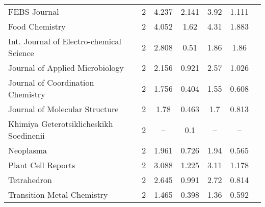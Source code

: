 {\begin{longtable}[c]{lcccccc}
 FEBS Journal                                              & 2  & 4.237         & 2.141          & 3.92 & 1.111         \\
 Food Chemistry                                            & 2  & 4.052         & 1.62           & 4.31 & 1.883         \\[1ex]
 Int. Journal of Electro-chemical Science                  & 2  & 2.808         & 0.51           & 1.86 & 1.86          \\
 Journal of Applied Microbiology                           & 2  & 2.156         & 0.921          & 2.57 & 1.026         \\
 Journal of Coordination Chemistry                         & 2  & 1.756         & 0.404          & 1.55 & 0.608         \\
 Journal of Molecular Structure                            & 2  & 1.78          & 0.463          & 1.7  & 0.813         \\[1ex]
 Khimiya Geterotsiklicheskikh Soedinenii                   & 2  & --            & 0.1            & --   & --              \\
 Neoplasma                                                 & 2  & 1.961         & 0.726          & 1.94 & 0.565         \\
 Plant Cell Reports                                        & 2  & 3.088         & 1.225          & 3.11 & 1.178         \\
 Tetrahedron                                               & 2  & 2.645         & 0.991          & 2.72 & 0.814         \\
 Transition Metal Chemistry                                & 2  & 1.465         & 0.398          & 1.36 & 0.592         \\[0.5ex]
\end{longtable}}

